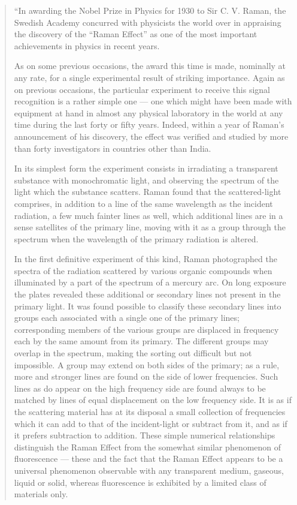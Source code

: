\begin{quote}
{\fontsize{10pt}{11.85pt}\selectfont
``In awarding the Nobel Prize in Physics for 1930 to Sir C. V. Raman, the Swedish Academy concurred with physicists the world over in appraising the discovery of the ``Raman Effect'' as one of the most important achievements in physics in recent years.

As on some previous occasions, the award this time is made, nominally at any rate, for a single experimental result of striking importance. Again as on previous occasions, the particular experiment to receive this signal recognition is a rather simple one --- one which might have been made with equipment at hand in almost any physical laboratory in the world at any time during the last forty or fifty years. Indeed, within a year of Raman's announcement of his discovery, the effect was verified and studied by more than forty investigators in countries other than India.

In its simplest form the experiment consists in irradiating a transparent substance with monochromatic light, and observing the spectrum of the light which the substance scatters. Raman found that the scattered-light comprises, in addition to a line of the same wavelength as the incident radiation, a few much fainter lines as well, which additional lines are in a sense satellites of the primary line, moving with it as a group through the spectrum when the wavelength of the primary radiation is altered.

In the first definitive experiment of this kind, Raman photogra\-phed the spectra of the radiation scattered by various organic compounds when illuminated by a part of the spectrum of a mercury arc. On long exposure the plates revealed these additional or secondary lines not present in the primary light. It was found possible to classify these secondary lines into groups each associated with a single one of the primary lines; corresponding members of the various groups are displaced in frequency each by the same amount from its primary. The different groups may overlap in the spectrum, making the sorting out difficult but not impossible. A group may extend on both sides of the primary; as a rule, more and stronger lines are found on the side of lower frequencies. Such lines as do appear on the high frequency side are found always to be matched by lines of equal displacement on the low frequency side. It is as if the scattering material has at its disposal a small collection of frequencies which it can add to that of the incident-light or subtract from it, and as if it prefers subtraction to addition. These simple numerical relationships distinguish the \hbox{Raman} Effect from the somewhat similar phenomenon of fluorescence --- these and the fact that the Raman Effect appears to be a universal phenomenon observable with any transparent medium, gaseous, liquid or solid, whereas fluorescence is exhibited by a limited class of materials only.


}
\end{quote}
